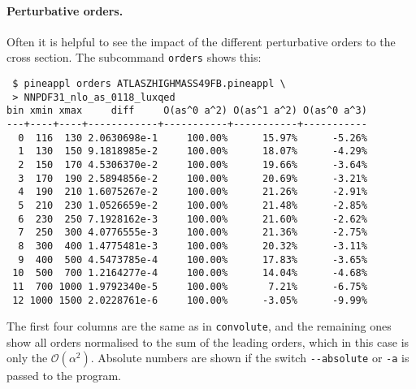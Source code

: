 \paragraph{Perturbative orders.}
Often it is helpful to see the impact of the different perturbative orders to the cross section.
The subcommand \texttt{orders} shows this:
\begin{verbatim}
 $ pineappl orders ATLASZHIGHMASS49FB.pineappl \
 > NNPDF31_nlo_as_0118_luxqed
bin xmin xmax     diff     O(as^0 a^2) O(as^1 a^2) O(as^0 a^3)
---+----+----+------------+-----------+-----------+-----------
  0  116  130 2.0630698e-1     100.00%      15.97%      -5.26%
  1  130  150 9.1818985e-2     100.00%      18.07%      -4.29%
  2  150  170 4.5306370e-2     100.00%      19.66%      -3.64%
  3  170  190 2.5894856e-2     100.00%      20.69%      -3.21%
  4  190  210 1.6075267e-2     100.00%      21.26%      -2.91%
  5  210  230 1.0526659e-2     100.00%      21.48%      -2.85%
  6  230  250 7.1928162e-3     100.00%      21.60%      -2.62%
  7  250  300 4.0776555e-3     100.00%      21.36%      -2.75%
  8  300  400 1.4775481e-3     100.00%      20.32%      -3.11%
  9  400  500 4.5473785e-4     100.00%      17.83%      -3.65%
 10  500  700 1.2164277e-4     100.00%      14.04%      -4.68%
 11  700 1000 1.9792340e-5     100.00%       7.21%      -6.75%
 12 1000 1500 2.0228761e-6     100.00%      -3.05%      -9.99%
\end{verbatim}
The first four columns are the same as in \texttt{convolute}, and the remaining ones show all orders normalised to the sum of the leading orders, which in this case is only the $\mathcal{O} (\alpha^2)$.
Absolute numbers are shown if the switch \texttt{-{}-absolute} or \texttt{-a} is passed to the program.

